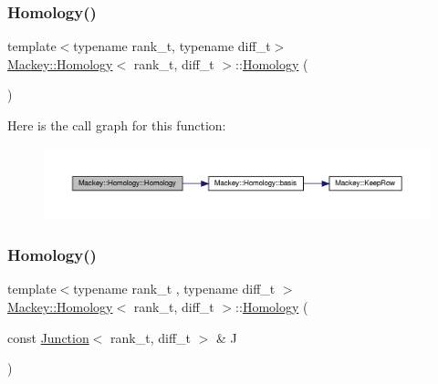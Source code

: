 \subsubsection{\texorpdfstring{Homology()}{Homology()}\hspace{0.1cm}{\footnotesize\ttfamily [1/2]}}
{\footnotesize\ttfamily template$<$typename rank\+\_\+t, typename diff\+\_\+t$>$ \\
\hyperlink{classMackey_1_1Homology}{Mackey\+::\+Homology}$<$ rank\+\_\+t, diff\+\_\+t $>$\+::\hyperlink{classMackey_1_1Homology}{Homology} (\begin{DoxyParamCaption}{ }\end{DoxyParamCaption})\hspace{0.3cm}{\ttfamily [inline]}}

Here is the call graph for this function\+:\nopagebreak
\begin{figure}[H]
\begin{center}
\leavevmode
\includegraphics[width=350pt]{classMackey_1_1Homology_a3580b194f986bd59a02fb84db97e00f2_cgraph}
\end{center}
\end{figure}
\mbox{\label{classMackey_1_1Homology_a31e26f0fb8e1cd7f0506ae1dbc97ea22}} 
\subsubsection{\texorpdfstring{Homology()}{Homology()}\hspace{0.1cm}{\footnotesize\ttfamily [2/2]}}
{\footnotesize\ttfamily template$<$typename rank\+\_\+t , typename diff\+\_\+t $>$ \\
\hyperlink{classMackey_1_1Homology}{Mackey\+::\+Homology}$<$ rank\+\_\+t, diff\+\_\+t $>$\+::\hyperlink{classMackey_1_1Homology}{Homology} (\begin{DoxyParamCaption}\item[{const \hyperlink{classMackey_1_1Junction}{Junction}$<$ rank\+\_\+t, diff\+\_\+t $>$ \&}]{J }\end{DoxyParamCaption})}



